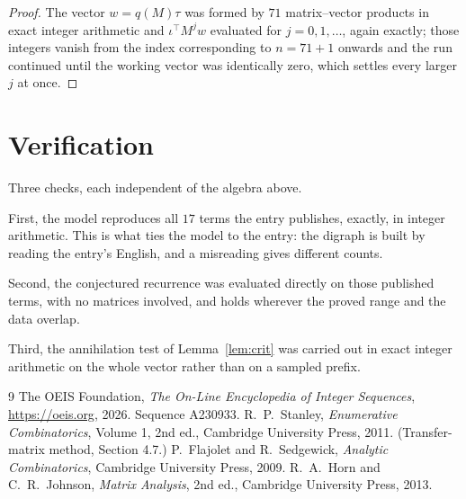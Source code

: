 \documentclass[11pt,a4paper]{article}
\theoremstyle{plain}
\theoremstyle{definition}
\begin{document}
\begin{proof}
The vector $w=q(M)\tau$ was formed by $71$ matrix--vector products in exact integer
arithmetic and $\iota^{\!\top}M^{j}w$ evaluated for $j=0,1,\dots$, again exactly; those
integers vanish from the index corresponding to $n=71+1$ onwards and the run continued
until the working vector was identically zero, which settles every larger $j$ at once.
\end{proof}

\section{Verification}

Three checks, each independent of the algebra above.

First, the model reproduces all $17$ terms the entry publishes, exactly, in integer
arithmetic. This is what ties the model to the entry: the digraph is built by reading the
entry's English, and a misreading gives different counts.

Second, the conjectured recurrence was evaluated directly on those published terms, with no
matrices involved, and holds wherever the proved range and the data overlap.

Third, the annihilation test of Lemma~\ref{lem:crit} was carried out in exact integer
arithmetic on the whole vector rather than on a sampled prefix.

\begin{thebibliography}{9}
 The OEIS Foundation, \emph{The On-Line Encyclopedia of Integer
Sequences}, \url{https://oeis.org}, 2026. Sequence A230933.
 R.~P.~Stanley, \emph{Enumerative Combinatorics}, Volume 1, 2nd ed.,
Cambridge University Press, 2011. (Transfer-matrix method, Section 4.7.)
 P.~Flajolet and R.~Sedgewick, \emph{Analytic Combinatorics}, Cambridge
University Press, 2009.
 R.~A.~Horn and C.~R.~Johnson, \emph{Matrix Analysis}, 2nd ed., Cambridge
University Press, 2013.
\end{thebibliography}
\end{document}
